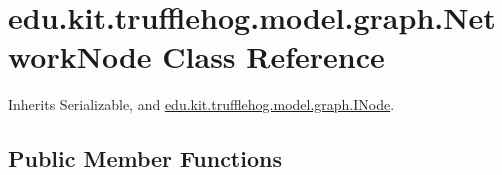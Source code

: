 \hypertarget{classedu_1_1kit_1_1trufflehog_1_1model_1_1graph_1_1_network_node}{}\section{edu.\+kit.\+trufflehog.\+model.\+graph.\+Network\+Node Class Reference}
\label{classedu_1_1kit_1_1trufflehog_1_1model_1_1graph_1_1_network_node}


Inherits Serializable, and \hyperlink{interfaceedu_1_1kit_1_1trufflehog_1_1model_1_1graph_1_1_i_node}{edu.\+kit.\+trufflehog.\+model.\+graph.\+I\+Node}.

\subsection*{Public Member Functions}
